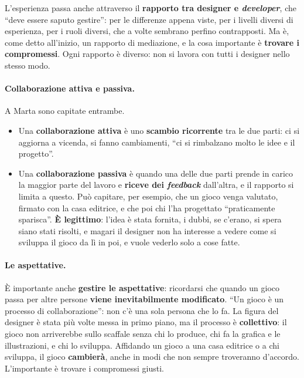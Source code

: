 

L'esperienza passa anche attraverso il \textbf{rapporto tra designer e \emph{developer}},
che ``deve essere saputo gestire'': per le differenze appena viste, per i livelli diversi
di esperienza, per i ruoli diversi, che a volte sembrano perfino contrapposti. Ma è, come
detto all'inizio, un rapporto di mediazione, e la cosa importante è \textbf{trovare i
compromessi}. Ogni rapporto è diverso: non si lavora con tutti i designer nello stesso
modo.

\paragraph{Collaborazione attiva e passiva.} A Marta sono capitate entrambe.
\begin{itemize}
  \item Una \textbf{collaborazione attiva} è uno \textbf{scambio ricorrente} tra le due
        parti: ci si aggiorna a vicenda, si fanno cambiamenti, ``ci si rimbalzano molto le
        idee e il progetto''.
  \item Una \textbf{collaborazione passiva} è quando una delle due parti prende in carico
        la maggior parte del lavoro e \textbf{riceve dei \emph{feedback}} dall'altra, e il
        rapporto si limita a questo. Può capitare, per esempio, che un gioco venga
        valutato, firmato con la casa editrice, e che poi chi l'ha progettato
        ``praticamente sparisca''. \textbf{È legittimo}: l'idea è stata fornita, i dubbi, se
        c'erano, si spera siano stati risolti, e magari il designer non ha interesse a
        vedere come si sviluppa il gioco da lì in poi, e vuole vederlo solo a cose fatte.
\end{itemize}

\paragraph{Le aspettative.} È importante anche \textbf{gestire le aspettative}: ricordarsi
che quando un gioco passa per altre persone \textbf{viene inevitabilmente modificato}.
``Un gioco è un processo di collaborazione'': non c'è una sola persona che lo fa. La
figura del designer è stata più volte messa in primo piano, ma il processo è
\textbf{collettivo}: il gioco non arriverebbe sullo scaffale senza chi lo produce, chi fa
la grafica e le illustrazioni, e chi lo sviluppa. Affidando un gioco a una casa editrice
o a chi sviluppa, il gioco \textbf{cambierà}, anche in modi che non sempre troveranno
d'accordo. L'importante è trovare i compromessi giusti.

